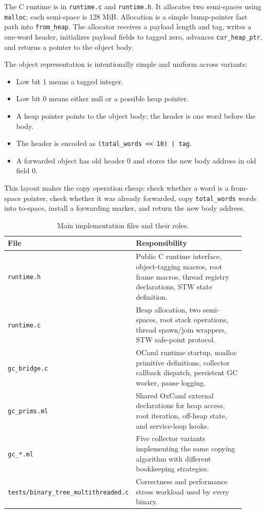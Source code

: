 \documentclass[11pt,a4paper]{article}
\begin{document}
The C runtime is in \texttt{runtime.c} and \texttt{runtime.h}.  It allocates two
semi-spaces using \texttt{malloc}; each semi-space is 128 MiB.  Allocation is a
simple bump-pointer fast path into \texttt{from\_heap}.  The allocator receives
a payload length and tag, writes a one-word header, initializes payload fields
to tagged zero, advances \texttt{cur\_heap\_ptr}, and returns a pointer to the
object body.

The object representation is intentionally simple and uniform across variants:
\begin{itemize}
  \item Low bit 1 means a tagged integer.
  \item Low bit 0 means either null or a possible heap pointer.
  \item A heap pointer points to the object body; the header is one word before
  the body.
  \item The header is encoded as \texttt{(total\_words << 10) | tag}.
  \item A forwarded object has old header 0 and stores the new body address in
  old field 0.
\end{itemize}

This layout makes the copy operation cheap: check whether a word is a
from-space pointer, check whether it was already forwarded, copy
\texttt{total\_words} words into to-space, install a forwarding marker, and
return the new body address.

\begin{table}[h]
\centering
\small
\begin{tabular}{@{}p{0.28\linewidth}p{0.64\linewidth}@{}}
\toprule
\textbf{File} & \textbf{Responsibility} \\
\midrule
\texttt{runtime.h} & Public C runtime interface, object-tagging macros, root
frame macros, thread registry declarations, STW state definition. \\
\texttt{runtime.c} & Heap allocation, two semi-spaces, root stack operations,
thread spawn/join wrappers, STW safe-point protocol. \\
\texttt{gc\_bridge.c} & OCaml runtime startup, noalloc primitive definitions,
collector callback dispatch, persistent GC worker, pause logging. \\
\texttt{gc\_prims.ml} & Shared OxCaml external declarations for heap access,
root iteration, off-heap state, and service-loop hooks. \\
\texttt{gc\_*.ml} & Five collector variants implementing the same copying
algorithm with different bookkeeping strategies. \\
\texttt{tests/binary\_tree\_multithreaded.c} & Correctness and performance
stress workload used by every binary. \\
\bottomrule
\end{tabular}
\caption{Main implementation files and their roles.}
\label{tab:filemap}
\end{table}
\end{document}
